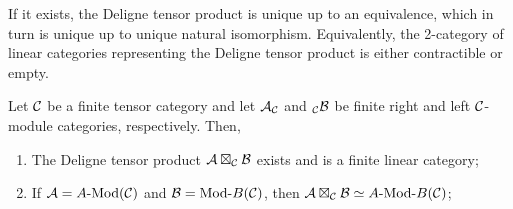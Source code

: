 \documentclass{amsart}
\begin{document}
If it exists, the Deligne tensor product is unique up to an equivalence, which in turn is unique up to unique natural isomorphism. Equivalently, the 2-category of linear categories representing the Deligne tensor product is either contractible or empty. 

\begin{theorem} \label{thm:DelignePrdtOverATCExists}
	Let $\mathcal C$ be a finite tensor category and let $\mathcal A_{\mathcal C}$ and ${}_{\mathcal C}\mathcal B$ be finite right and left $\mathcal C$-module categories, respectively. Then, 
	\begin{enumerate}
		\item The Deligne tensor product $\mathcal A \boxtimes_{\mathcal C} \mathcal B$ exists and is a finite linear category;
		\item If $\cA = \Mod{A}{}(\cC)$ and $\cB = \Mod{}{B}(\cC)$, then $\cA \boxtimes_{\cC} \cB \simeq \Mod{A }{B}(\cC)$;
	\end{enumerate} 
\end{theorem}
\end{document}
